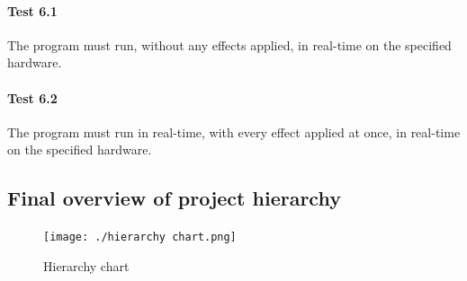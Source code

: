 \paragraph{Test 6.1} The program must run, without any effects applied, in real-time on the specified hardware.
\paragraph{Test 6.2} The program must run in real-time, with every effect applied at once, in real-time on the specified hardware.

\pagebreak
\subsection{Final overview of project hierarchy}
\begin{figure}[H]
	\texttt{[image: ./hierarchy chart.png]}
	\caption{Hierarchy chart }
\end{figure}
